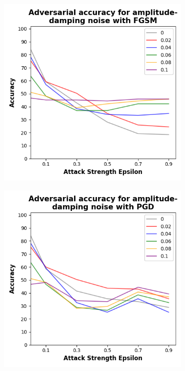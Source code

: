 \begin{figure}[!h]
  \centering

  \begin{subfigure}{0.45\textwidth}
      \includegraphics[width=\linewidth]{figures/evaluation_results/breast-cancer/pqc/figures/amplitude-damping-fgsm.png}
      \label{fig:bc5}
  \end{subfigure} \qquad
  \begin{subfigure}{0.45\textwidth}
      \includegraphics[width=\linewidth]{figures/evaluation_results/breast-cancer/pqc/figures/amplitude-damping-pgd.png}

\end{subfigure}
\end{figure}
